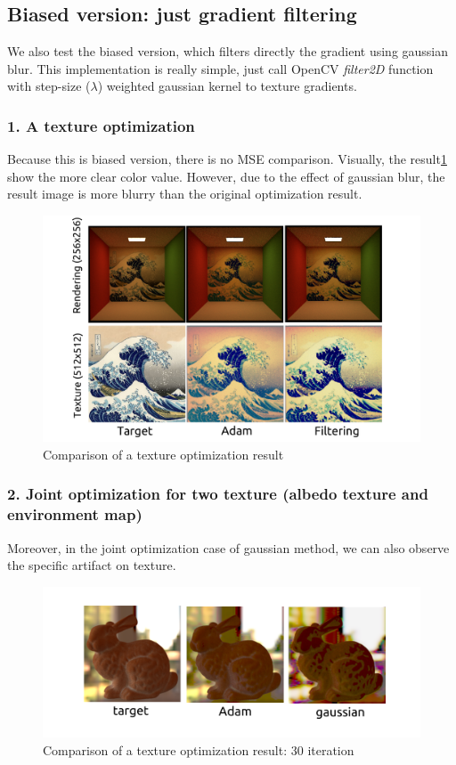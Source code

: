 \newpage
\subsection*{Biased version: just gradient filtering}

We also test the biased version, which filters directly the gradient using gaussian blur. This implementation is really simple, just call OpenCV \emph{filter2D} function with step-size ($\lambda$) weighted gaussian kernel to texture gradients.

\subsubsection{1. A texture optimization}

Because this is biased version, there is no MSE comparison. Visually, the result\ref{fig:a-texture-comparision-gaussian} show the more clear color value. However, due to the effect of gaussian blur, the result image is more blurry than the original optimization result.

\begin{figure}[!h]
    \includegraphics[width=\textwidth]{figures/result-3.png}
    \caption{Comparison of a texture optimization result}
    \label{fig:a-texture-comparision-gaussian}
\end{figure}

\subsubsection{2. Joint optimization for two texture (albedo texture and environment map)}

Moreover, in the joint optimization case of gaussian method, we can also observe the specific artifact on texture.

\begin{figure}[!h]
    \includegraphics[width=\textwidth]{figures/result-4.png}
    \caption{Comparison of a texture optimization result: 30 iteration}
    \label{fig:a-texture-comparision-gaussian-joint}
\end{figure}